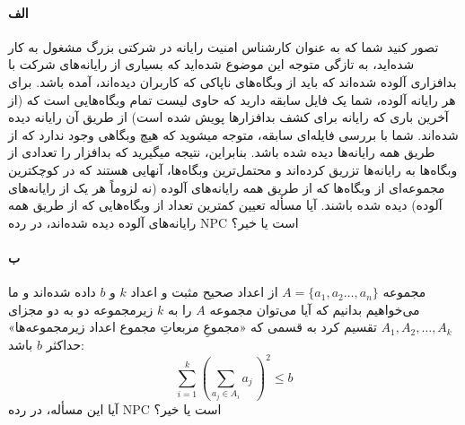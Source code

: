 \documentclass[]{article}
\begin{document}
\paragraph*{الف}
تصور کنید شما که به عنوان کارشناس امنیت رایانه در شرکتی بزرگ مشغول به کار شده‌اید،
به تازگی متوجه این موضوع شده‌اید که بسیاری از رایانه‌های شرکت با بدافزاری آلوده شده‌اند که باید از وبگاه‌های ناپاکی که کاربران دیده‌اند، آمده باشد.
برای هر رایانه آلوده، شما یک فایل سابقه دارید که حاوی لیست تمام وبگاه‌هایی است که 
(از آخرین باری که رایانه برای کشف بدافزارها پویش شده است) از طریق آن رایانه دیده شده‌اند.
شما با بررسی فایله‌ای سابقه، متوجه میشوید که هیچ وبگاهی وجود ندارد که از طریق همه رایانه‌ها دیده شده باشد.
بنابراین، نتیجه میگیرید که بدافزار را تعدادی از وبگاه‌ها به رایانه‌ها تزریق کرده‌اند و محتمل‌ترین وبگاه‌ها،
آنهایی هستند که در کوچکترین مجموعه‌ای از وبگاه‌ها که از طریق همه رایانه‌های آلوده (نه لزوماً هر یک از رایانه‌های آلوده) دیده شده باشند.
آیا مسأله تعیین کمترین تعداد از وبگاه‌هایی که از طریق همه رایانه‌های آلوده دیده شده‌اند، در رده NPC است یا خیر؟

\paragraph*{ب}
مجموعه $A = \lbrace a_1, a_2 \dots, a_n \rbrace$ از اعداد صحیح مثبت و اعداد $k$ و $b$ داده شده‌اند
و ما می‌خواهیم بدانیم که آیا می‌توان مجموعه $A$ را به $k$ زیرمجموعه دو به دو مجزای
$A_1 , A_2, \dots, A_k$ تقسیم کرد
به قسمی که «مجموعِ مربعاتِ مجموع اعداد زیرمجموعه‌ها» حداکثر $b$ باشد:
$$\sum_{i=1}^{k} (\sum_{a_j \in A_i}a_j \,)^2 \leq b$$
آیا این مسأله، در رده NPC است یا خیر؟
\end{document}
